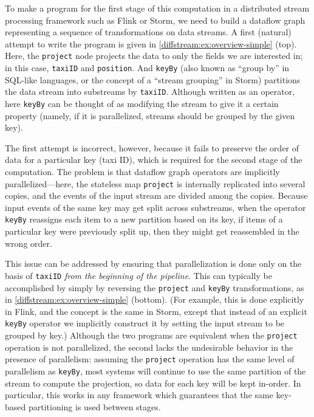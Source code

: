 To make a program for the first stage of this computation in a distributed stream processing framework such as Flink or Storm, we need to build a dataflow graph representing a sequence of transformations on data streams. A first (natural) attempt to write the program is given in \cref{diffstream:ex:overview-simple} (top). Here, the \texttt{project} node projects the data to only the fields we are interested in; in this case, \texttt{taxiID} and \texttt{position}. And \texttt{keyBy} (also known as ``group by'' in SQL-like languages, or the concept of a ``stream grouping'' in Storm) partitions the data stream into substreams by \texttt{taxiID}.
Although written as an operator, here \texttt{keyBy} can be thought of as modifying the stream to give it a certain property (namely, if it is parallelized, streams should be grouped by the given key).

The first attempt is incorrect, however, because it fails to preserve
the order of data for a particular key (taxi ID), which is required
for the second stage of the computation. The problem is that dataflow
graph operators are implicitly parallelized---here, the stateless map
\texttt{project} is internally replicated into several copies, and the
events of the input stream are divided among the copies.
Because input events of the same key may get split across substreams,
when the operator \texttt{keyBy} reassigns each item to a new
partition based on its key, if items of a particular key were
previously split up, then they might get reassembled in the wrong
order.

This issue can be addressed by ensuring that parallelization is done only on the basis of \texttt{taxiID} \emph{from the beginning of the pipeline}.
This can typically be accomplished by simply by reversing the \texttt{project} and \texttt{keyBy} transformations, as in \cref{diffstream:ex:overview-simple} (bottom).
(For example, this is done explicitly in Flink, and the concept is the same in Storm, except that instead of an explicit \texttt{keyBy} operator we implicitly construct it by setting the input stream to be grouped by key.)
Although the two programs are equivalent when the \texttt{project} operation is not parallelized, the second lacks the undesirable behavior in the presence of parallelism: assuming the \texttt{project} operation has the same level of parallelism as \texttt{keyBy}, most systems will continue to use the same partition of the stream to compute the projection, so data for each key will be kept in-order. In particular, this works in any framework which guarantees that the same key-based partitioning is used between stages.

